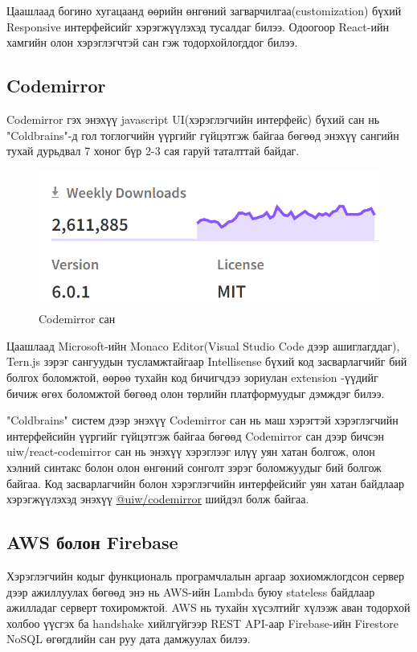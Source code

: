 Цаашлаад богино хугацаанд өөрийн өнгөний загварчилгаа(customization) бүхий Responsive интерфейсийг хэрэгжүүлэхэд тусалдаг билээ. Одоогоор React-ийн хамгийн олон хэрэглэгчтэй сан гэж тодорхойлогддог билээ. 

\subsection{Codemirror}
Codemirror гэх энэхүү javascript UI(хэрэглэгчийн интерфейс) бүхий сан нь "Coldbrains"-д гол тоглогчийн үүргийг гүйцэтгэж байгаа бөгөөд энэхүү сангийн тухай дурьдвал
7 хоног бүр 2-3 сая гаруй таталттай байдаг\cite{codemirrorinfo}.   

\begin{figure}[h]
  \centering
  \includegraphics{img/codemirror-npm.PNG}
  \caption{Codemirror сан}
\end{figure}

Цаашлаад Microsoft-ийн Monaco Editor(Visual Studio Code дээр ашиглагддаг), Tern.js зэрэг сангуудын тусламжтайгаар Intellisense бүхий код засварлагчийг бий болгох боломжтой,  өөрөө тухайн код бичигчдээ зориулан extension\footnotemark{} -үүдийг бичиж өгөх боломжтой бөгөөд олон төрлийн платформуудыг дэмждэг билээ. 

"Coldbrains" систем дээр энэхүү Codemirror сан нь маш хэрэгтэй хэрэглэгчийн интерфейсийн үүргийг гүйцэтгэж байгаа бөгөөд Codemirror сан дээр бичсэн uiw/react-codemirror сан нь энэхүү хэрэглээг илүү уян хатан болгож, олон хэлний синтакс болон олон өнгөний сонголт зэрэг боломжуудыг бий болгож байгаа. Код засварлагчийн болон хэрэглэгчийн интерфейсийг уян хатан байдлаар хэрэгжүүлэхэд энэхүү \hyperlink{https://uiwjs.github.io/react-codemirror/}{@uiw/codemirror} шийдэл болж байгаа.

\subsection{AWS болон Firebase}
Хэрэглэгчийн кодыг функциональ програмчлалын аргаар зохиомжлогдсон сервер дээр ажиллуулах бөгөөд энэ нь AWS-ийн Lambda буюу stateless байдлаар ажилладаг серверт тохиромжтой. AWS нь тухайн хүсэлтийг хүлээж аван тодорхой холбоо үүсгэх ба handshake хийлгүйгээр REST API-аар Firebase-ийн Firestore NoSQL өгөгдлийн сан руу дата дамжуулах билээ. 

